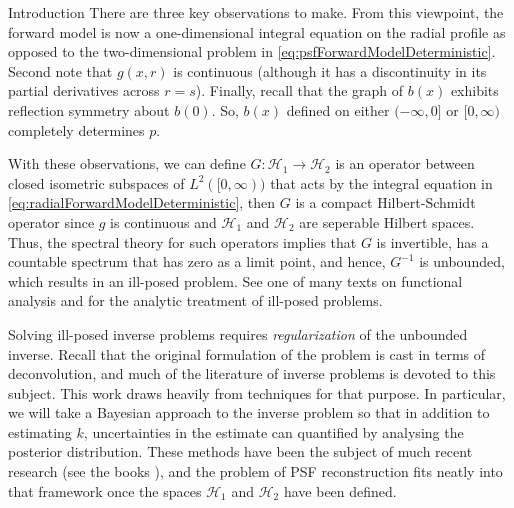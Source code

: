 \begin{chapter}{Introduction}
  There are three key observations to make.
  From this viewpoint, the forward model is now a one-dimensional integral equation on the radial profile as opposed to the two-dimensional problem in \eqref{eq:psfForwardModelDeterministic}.
  Second note that $g(x,r)$ is continuous (although it has a discontinuity in its partial derivatives across $r=s$).
  Finally, recall that the graph of $b(x)$ exhibits reflection symmetry about $b(0)$.
  So, $b(x)$ defined on either $(-\infty,0]$ or $[0,\infty)$ completely determines $p$.

  With these observations, we can define $G: \mathcal H_1 \to \mathcal H_2$ is an operator between closed isometric subspaces of $L^2([0,\infty))$ that acts by the integral equation in \eqref{eq:radialForwardModelDeterministic}, then $G$ is a compact Hilbert-Schmidt operator since $g$ is continuous and $\mathcal H_1$ and $\mathcal H_2$ are seperable Hilbert spaces.
  Thus, the spectral theory for such operators implies that $G$ is invertible, has a countable spectrum that has zero as a limit point, and hence, $G^{-1}$ is unbounded, which results in an ill-posed problem. 
  See one of many texts on functional analysis \citep{bachman1966,rudin1991} and \citep{tikhonov1963,vogel2002,morozov1993} for the analytic treatment of ill-posed problems.

  Solving ill-posed inverse problems requires \emph{regularization} of the unbounded inverse.
  Recall that the original formulation of the problem is cast in terms of deconvolution, and much of the literature of inverse problems is devoted to this subject.
  This work draws heavily from techniques for that purpose. 
  In particular, we will take a Bayesian approach to the inverse problem so that in addition to estimating $k$, uncertainties in the estimate can quantified by analysing the posterior distribution.
  These methods have been the subject of much recent research (see the books \citep{calvetti2007introduction,kaipo2005,stuart2010}), and the problem of PSF reconstruction fits neatly into that framework once the spaces $\mathcal H_1$ and $\mathcal H_2$ have been defined.

\begin{figure}
  \begin{center}
\end{center}
\end{figure}
\end{chapter}
